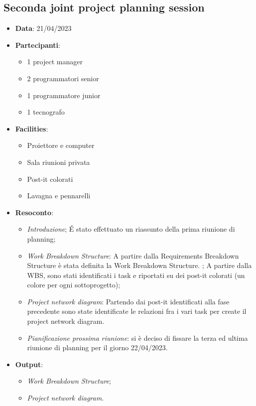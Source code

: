 \documentclass{article}
\begin{document}
  \subsection{Seconda joint project planning session}
  \begin{itemize}
    \item \textbf{Data}: 21/04/2023
    \item \textbf{Partecipanti}:
    \begin{itemize}
      \item 1 project manager
      \item 2 programmatori senior
      \item 1 programmatore junior
      \item 1 tecnografo
    \end{itemize}
    \item \textbf{Facilities}:
    \begin{itemize}
      \item Proiettore e computer
      \item Sala riunioni privata
      \item Post-it colorati
      \item Lavagna e pennarelli
    \end{itemize}
    \item \textbf{Resoconto}:
    \begin{itemize}
      \item \emph{Introduzione};
        É stato effettuato un riassunto della prima riunione di planning;
      \item \emph{Work Breakdown Structure}:
        A partire dalla Requirements Breakdown Structure è stata definita la Work Breakdown Structure. ;
        A partire dalla WBS, sono stati identificati i task e riportati su dei post-it colorati (un colore per ogni sottoprogetto);
      \item \emph{Project network diagram}:
        Partendo dai post-it identificati alla fase precedente sono state identificate le relazioni fra i 
        vari task per create il project network diagram.
      \item \emph{Pianificazione prossima riunione}: si è deciso di fissare la terza ed ultima riunione 
        di planning per il giorno 22/04/2023.
    \end{itemize}
    \item \textbf{Output}: 
    \begin{itemize}
      \item \emph{Work Breakdown Structure};
      \item \emph{Project network diagram}.
    \end{itemize}
  \end{itemize}
\end{document}
